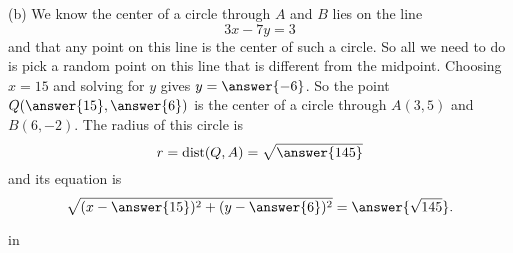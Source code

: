 \documentclass{ximera}
\newcommand{\pskip}{\vskip 0.1 in}
\begin{document}
\begin{example}
\begin{question}
\begin{explanation}
(b) We know the center of a circle through $A$ and $B$ lies on the line 
\[
    3x - 7y = 3
\]
and that any point on this line is the center of such a circle. So all we need to do is pick a random point on this line that is different from the midpoint. Choosing $x=15$ and solving for $y$ gives $y=\answer{-6}$. So the point $Q(\answer{15},\answer{6})$ is the center of a circle through $A(3,5)$ and $B(6,-2)$. The radius of this circle is
\[
  r  =\text{dist}(Q,A) = \sqrt{\answer{145}}  
\]
and its equation is
\[
   \sqrt{(x-\answer{15})^2 + (y-\answer{6})^2} = \answer{\sqrt{145}} .
\]
\end{explanation}

\end{question}

\end{example}

\pskip
\end{document}

